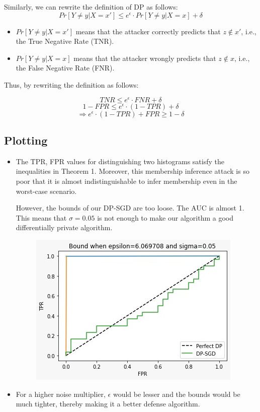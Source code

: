 Similarly, we can rewrite the definition of DP as follows:
$$ Pr[Y \neq y | X=x'] \leq e^\epsilon \cdot Pr[Y \neq y|X=x] + \delta $$

\begin{itemize}
    \item $Pr[Y \neq y | X=x']$ means that the attacker correctly predicts that $z \notin x'$, i.e., the True Negative Rate (TNR).

    \item $Pr[Y \neq y|X = x]$ means that the attacker wrongly predicts that $z \notin x$, i.e., the False Negative Rate (FNR).
\end{itemize}

Thus, by rewriting the definition as follows:

$$ TNR \leq e^\epsilon \cdot FNR + \delta $$
$$ 1 - FPR \leq e^\epsilon \cdot (1-TPR) + \delta $$
$$ \Rightarrow e^\epsilon \cdot (1-TPR) + FPR \geq 1 - \delta  $$

\subsection*{Plotting}

\begin{itemize}
    \item The TPR, FPR values for distinguishing two histograms satisfy the inequalities in Theorem 1. Moreover, this membership inference attack is so poor that it is almost indistinguishable to infer membership even in the worst-case scenario.
    
    However, the bounds of our DP-SGD are too loose. The AUC is almost 1. This means that $\sigma = 0.05$ is not enough to make our algorithm a good differentially private algorithm.
    \begin{figure}[htp]
        \centering
        \includegraphics[width=0.5\linewidth]{report//images/quest3.jpeg}
    \end{figure}

    \item For a higher noise multiplier, $\epsilon$ would be lesser and the bounds would be much tighter, thereby making it a better defense algorithm. 
\end{itemize}






